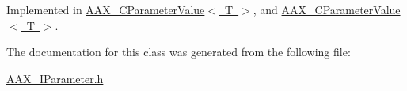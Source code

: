 Implemented in \mbox{\hyperlink{a01533_a96661507efdc490252bbfebe5d716c65}{A\+A\+X\+\_\+\+C\+Parameter\+Value$<$ T $>$}}, and \mbox{\hyperlink{a01533_a35153159e40183807eae373c21b38bcc}{A\+A\+X\+\_\+\+C\+Parameter\+Value$<$ T $>$}}.



The documentation for this class was generated from the following file\+:\begin{DoxyCompactItemize}
\item 
\mbox{\hyperlink{a00623}{A\+A\+X\+\_\+\+I\+Parameter.\+h}}\end{DoxyCompactItemize}
